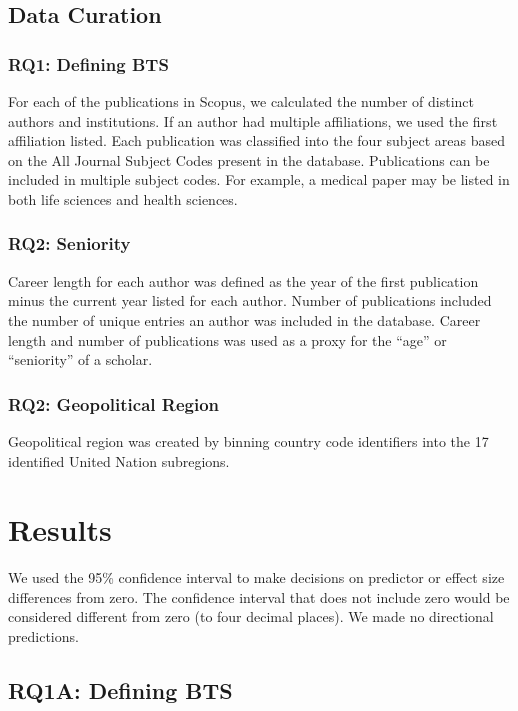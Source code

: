 \documentclass[
  man,floatsintext]{apa7}
\begin{document}
\subsection{Data Curation}\label{data-curation}

\subsubsection{RQ1: Defining BTS}\label{rq1-defining-bts}

For each of the publications in Scopus, we calculated the number of
distinct authors and institutions. If an author had multiple
affiliations, we used the first affiliation listed. Each publication was
classified into the four subject areas based on the All Journal Subject
Codes present in the database. Publications can be included in multiple
subject codes. For example, a medical paper may be listed in both life
sciences and health sciences.

\subsubsection{RQ2: Seniority}\label{rq2-seniority}

Career length for each author was defined as the year of the first
publication minus the current year listed for each author. Number of
publications included the number of unique entries an author was
included in the database. Career length and number of publications was
used as a proxy for the ``age'' or ``seniority'' of a scholar.

\subsubsection{RQ2: Geopolitical Region}\label{rq2-geopolitical-region}

Geopolitical region was created by binning country code identifiers into
the 17 identified United Nation subregions.

\section{Results}\label{results}

We used the 95\% confidence interval to make decisions on predictor or
effect size differences from zero. The confidence interval that does not
include zero would be considered different from zero (to four decimal
places). We made no directional predictions.

\subsection{RQ1A: Defining BTS}\label{rq1a-defining-bts}
\end{document}
